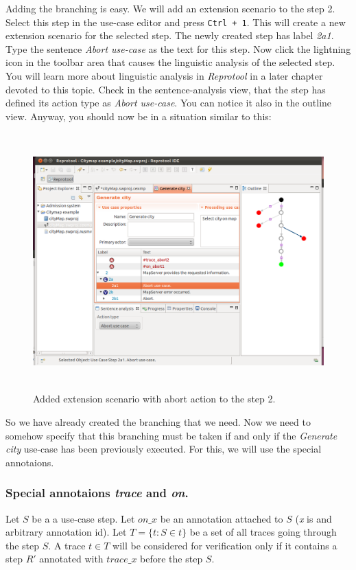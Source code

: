 Adding the branching is easy. We will add an extension scenario to the step 2. Select this step in the use-case editor and press
\texttt{Ctrl + 1}. This will create a new extension scenario for the selected step. The newly created step has label \emph{2a1}.
Type the sentence \emph{Abort use-case} as the text for this step. Now click the lightning icon in the toolbar area that causes
the linguistic analysis of the selected step. You will learn more about linguistic analysis in \emph{Reprotool} in a later chapter
devoted to this topic. Check in the sentence-analysis view, that the step has defined its action type as \emph{Abort use-case}.
You can notice it also in the outline view. Anyway, you should now be in a situation similar to this:

\newpage

\begin{figure}[ht]
  \centering
  \includegraphics[height=280pt]{images/reprotoolTraceCityMapFix1}
  \caption{Added extension scenario with abort action to the step 2.}
  \label{fig:reprotoolTraceCityMapFix1}
\end{figure}

So we have already created the branching that we need. Now we need to somehow specify that this branching must be taken if and
only if the \emph{Generate city} use-case has been previously executed. For this, we will use the special annotaions.

\subsubsection{Special annotaions \emph{trace} and \emph{on}.}
\begin{definition}
	Let $S$ be a a use-case step.
	Let $on\_x$ be an annotation attached to $S$ (\emph{x} is and arbitrary annotation id).
	Let $T=\{t: S \in t\}$ be a set of all traces going through the step $S$.
	A trace $t \in T$ will be considered for verification only if it contains a step $R'$ annotated with $trace\_x$ before the step $S$.
\end{definition}

